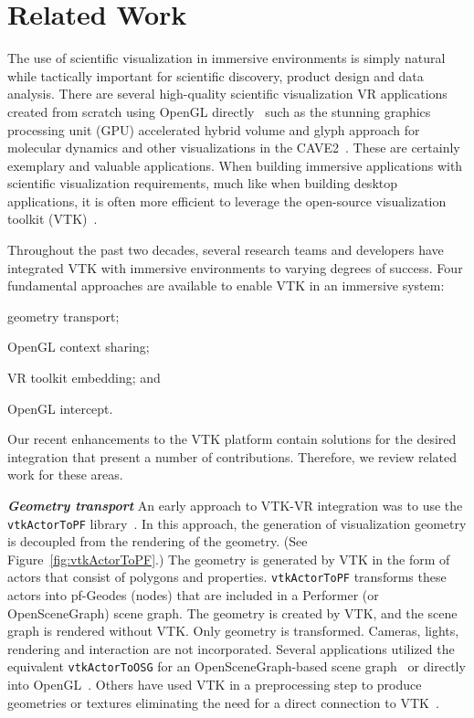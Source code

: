 \section{Related Work}

The use of scientific visualization in immersive environments is simply natural while tactically important for scientific discovery, product design and data analysis.
There are several high-quality scientific visualization VR applications created from scratch using OpenGL directly~\cite{Billen:2008, LaViola:2007, Schulze:2001, Rantzau:1998} such as the stunning graphics processing unit (GPU) accelerated hybrid volume and glyph approach for molecular dynamics and other visualizations in the CAVE2\texttrademark~\cite{Reda:2013, Reda:2013a}.
These are certainly exemplary and valuable applications.
When building immersive applications with scientific visualization requirements, much like when building desktop applications, it is often more efficient to leverage the open-source visualization toolkit (VTK)~\cite{Schroeder:2004}.

Throughout the past two decades, several research teams and developers have integrated VTK with immersive environments to varying degrees of success.
Four fundamental approaches are available to enable VTK in an immersive system:

\begin{compactitem}
\item geometry transport;
\item OpenGL context sharing;
\item VR toolkit embedding; and
\item OpenGL intercept.
\end{compactitem}

Our recent enhancements to the VTK platform contain solutions for the desired integration that present a number of contributions. Therefore, we review related work for these areas.

\textbf{\textit{Geometry transport}}
An early approach to VTK-VR integration was to use the \texttt{vtkActorToPF} library~\cite{Leigh98limbo/vtk}.
In this approach, the generation of visualization geometry is decoupled from
the rendering of the geometry. (See Figure~\ref{fig:vtkActorToPF}.) 
The geometry is generated by VTK in the form of actors that consist of polygons and properties.
\texttt{vtkActorToPF} transforms these actors into pf-Geodes (nodes) that are included in a Performer (or OpenSceneGraph) scene graph. The geometry is created by VTK, and the scene graph is rendered without VTK. Only geometry is transformed. Cameras, lights, rendering and interaction are not incorporated. Several applications utilized the equivalent \texttt{vtkActorToOSG} for an OpenSceneGraph-based scene graph~\cite{VE-Suite:2016} or directly into OpenGL~\cite{Ohno:2006}. Others have used VTK in a preprocessing step to produce geometries or textures eliminating the need for a direct connection to VTK~\cite{Bivins:2005}.

